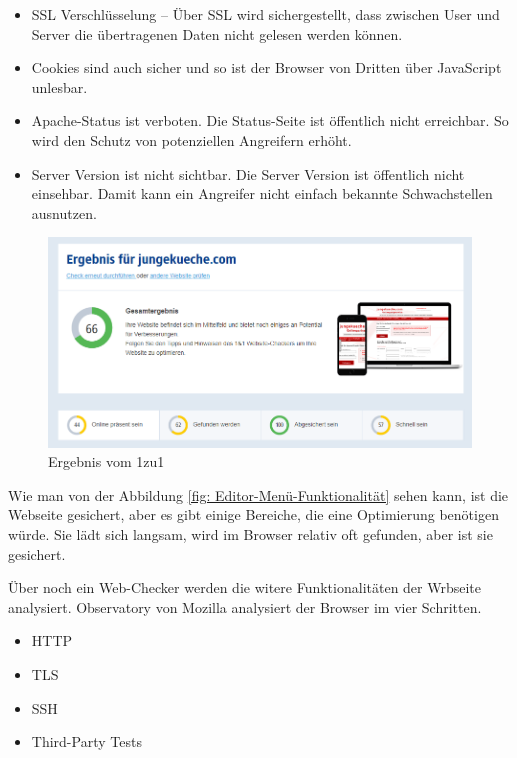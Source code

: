 \begin{itemize}	
	
\item\ac{SSL} Verschlüsselung – Über SSL wird sichergestellt, dass zwischen User und Server die übertragenen Daten nicht gelesen werden können.

\item Cookies sind auch sicher und so ist der Browser von Dritten über JavaScript unlesbar.

\item Apache-Status ist verboten. Die Status-Seite ist öffentlich nicht erreichbar. So wird den Schutz von potenziellen Angreifern erhöht. 

\item Server Version ist nicht sichtbar. Die Server Version ist öffentlich nicht einsehbar. Damit kann ein Angreifer nicht einfach bekannte Schwachstellen ausnutzen.
\end{itemize}

\begin{figure}[h]
	\centering
	\includegraphics[width=1\linewidth]{Graphics/egebnis1to1.png}
	\caption[Egebniss Von 1zu1]{Ergebnis vom 1zu1}
	\label{fig: Egebniss Von 1zu1}
\end{figure}

Wie man von der Abbildung \ref{fig: Editor-Menü-Funktionalität} sehen kann, ist die Webseite gesichert, aber es gibt einige Bereiche, die eine Optimierung benötigen würde. Sie lädt sich langsam, wird im Browser relativ oft gefunden, aber ist sie gesichert. 

Über noch ein Web-Checker werden die witere Funktionalitäten der Wrbseite analysiert. Observatory\cite[postnote]{bentley:1999} von Mozilla analysiert der Browser im vier Schritten. 

\begin{itemize}	
	\item \ac{HTTP}
	\item \ac{TLS}
	\item \ac{SSH}
	\item \ac{Third-Party Tests}
\end{itemize}

